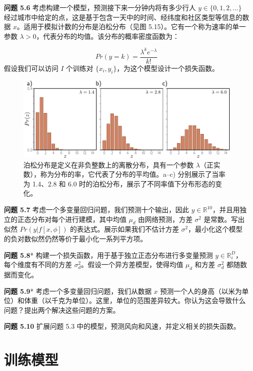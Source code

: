 \documentclass[lang=cn,newtx,10pt,scheme=chinese]{elegantbook}
\begin{document}
\textbf{问题 5.6} 考虑构建一个模型，预测接下来一分钟内将有多少行人 \(y \in \{0, 1, 2, \ldots\}\) 经过城市中给定的点，这是基于包含一天中的时间、经纬度和社区类型等信息的数据 \(x\)。适用于模拟计数的分布是泊松分布（见图 5.15）。它有一个称为速率的单一参数 \(\lambda > 0\)，代表分布的均值。该分布的概率密度函数为：

\begin{equation}
Pr(y = k) = \frac{\lambda^k e^{-\lambda}}{k!} 
\end{equation}
假设我们可以访问 \(I\) 个训练对 \(\{x_i, y_i\}\)，为这个模型设计一个损失函数。

\begin{figure}[ht!]
	\centering
	\includegraphics[width=0.7\linewidth]{PDFFigures/UDLChap5PDF/LossPoisson.pdf}
	\caption{泊松分布是定义在非负整数上的离散分布，具有一个参数 \(\lambda\)（正实数），称为分布的率，它代表了分布的平均值。a–c) 分别展示了当率为 1.4、2.8 和 6.0 时的泊松分布，展示了不同率值下分布形态的变化。}
\end{figure}


\textbf{问题 5.7} 考虑一个多变量回归问题，我们预测十个输出，因此 \(y \in \mathbb{R}^{10}\)，并且用独立的正态分布对每个进行建模，其中均值 \(\mu_d\) 由网络预测，方差 \(\sigma^2\) 是常数。写出似然 \(Pr(y|f[x, \phi])\) 的表达式。展示如果我们不估计方差 \(\sigma^2\)，最小化这个模型的负对数似然仍然等价于最小化一系列平方项。

\textbf{问题 5.8}* 构建一个损失函数，用于基于独立正态分布进行多变量预测 \(y \in \mathbb{R}^D_i\)，每个维度有不同的方差 \(\sigma_d^2\)。假设一个异方差模型，使得均值 \(\mu_d\) 和方差 \(\sigma_d^2\) 都随数据而变化。

\textbf{问题 5.9}* 考虑一个多变量回归问题，我们从数据 \(x\) 预测一个人的身高（以米为单位）和体重（以千克为单位）。这里，单位的范围差异较大。你认为这会导致什么问题？提出两个解决这些问题的方案。

\textbf{问题 5.10} 扩展问题 5.3 中的模型，预测风向和风速，并定义相关的损失函数。

\chapter{训练模型}
\end{document}

